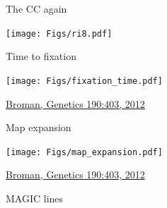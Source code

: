 \documentclass[12pt]{article}
\newcommand{\citesize}{\fontsize{14}{18} \selectfont}
\newcommand{\headsize}{\fontsize{35}{35} \selectfont}
\begin{document}
{\newpage


\headsize \color{myyellow}
\hfill \begin{minipage}{5.75in}
\centering
The CC again
\end{minipage}

\vfill

\centerline{\texttt{[image: Figs/ri8.pdf]}}


\newpage


\headsize \color{myyellow}
\hfill \begin{minipage}{5.75in}
\centering
Time to fixation
\end{minipage}

\vspace{15mm}

\centerline{\texttt{[image: Figs/fixation\_time.pdf]}}


\vfill

\hfill {\citesize \color{citecolor} \href{http://www.genetics.org/content/190/2/403.full}{Broman, Genetics
190:403, 2012}}

\vspace*{5mm}



\newpage


\headsize \color{myyellow}
\hfill \begin{minipage}{5.75in}
\centering
Map expansion
\end{minipage}

\vspace{12mm}

\centerline{\texttt{[image: Figs/map\_expansion.pdf]}}

\vfill

\hfill {\citesize \color{citecolor} \href{http://www.genetics.org/content/190/2/403.full}{Broman, Genetics
190:403, 2012}}

\vspace*{5mm}



\newpage


\headsize \color{myyellow}
\hfill \begin{minipage}{5.75in}
\centering
MAGIC lines
\end{minipage}

}
\end{document}
